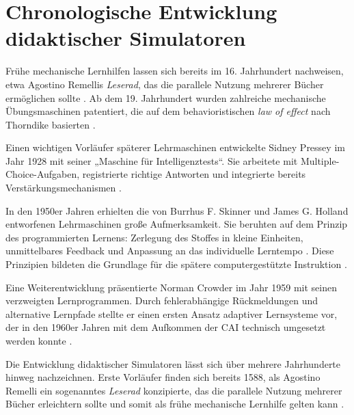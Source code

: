 \section{Chronologische Entwicklung didaktischer Simulatoren}\label{chap:3-2-development-sim}

Frühe mechanische Lernhilfen lassen sich bereits im 16. Jahrhundert nachweisen, etwa Agostino Remellis \textit{Leserad}, das die parallele Nutzung mehrerer Bücher ermöglichen sollte \parencite{cayetano_geschichte_2022}. Ab dem 19. Jahrhundert wurden zahlreiche mechanische Übungsmaschinen patentiert, die auf dem behavioristischen \textit{law of effect} nach Thorndike basierten \parencite[S.~3]{niegemann_kompendium_2008}. 

Einen wichtigen Vorläufer späterer Lehrmaschinen entwickelte Sidney Pressey im Jahr 1928 mit seiner „Maschine für Intelligenztests“. Sie arbeitete mit Multiple-Choice-Aufgaben, registrierte richtige Antworten und integrierte bereits Verstärkungsmechanismen \parencites[S.~705]{benjamin_history_1988}[S.~969f]{skinner_teaching_1958}. 

In den 1950er Jahren erhielten die von Burrhus F. Skinner und James G. Holland entworfenen Lehrmaschinen große Aufmerksamkeit. Sie beruhten auf dem Prinzip des programmierten Lernens: Zerlegung des Stoffes in kleine Einheiten, unmittelbares Feedback und Anpassung an das individuelle Lerntempo \parencite[S.~970ff]{skinner_teaching_1958}. Diese Prinzipien bildeten die Grundlage für die spätere computergestützte Instruktion \parencite[S.~1971]{bruillard_teaching_2020}. 

Eine Weiterentwicklung präsentierte Norman Crowder im Jahr 1959 mit seinen verzweigten Lernprogrammen. Durch fehlerabhängige Rückmeldungen und alternative Lernpfade stellte er einen ersten Ansatz adaptiver Lernsysteme vor, der in den 1960er Jahren mit dem Aufkommen der \ac{CAI} technisch umgesetzt werden konnte \parencites[S.~252ff]{crowder_differences_1963}[S.~9]{schonfeld_computerbasiertes_2006}.

\iffalse
Die Entwicklung didaktischer Simulatoren lässt sich über mehrere Jahrhunderte hinweg nachzeichnen. Erste Vorläufer finden sich bereits 1588, als Agostino Remelli ein sogenanntes \textit{Leserad} konzipierte, das die parallele Nutzung mehrerer Bücher erleichtern sollte und somit als frühe mechanische Lernhilfe gelten kann \parencite{cayetano_geschichte_2022}.

